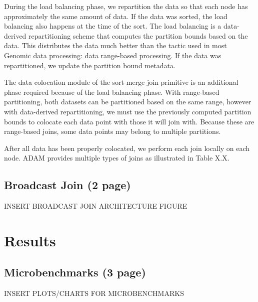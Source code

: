 \documentclass{vldb}
\begin{document}
During the load balancing phase, we repartition the data so that each node has approximately
the same amount of data. If the data was sorted, the load balancing also happens at the 
time of the sort. The load balancing is a data-derived repartitioning scheme that computes
the partition bounds based on the data. This distributes the data much better than the tactic 
used in most Genomic data processing: data range-based processing. If the data was 
repartitioned, we update the partition bound metadata.

The data colocation module of the sort-merge join primitive is an additional phase required
because of the load balancing phase. With range-based partitioning, both datasets can be
partitioned based on the same range, however with data-derived repartitioning, we must use
the previously computed partition bounds to colocate each data point with those it will join
with. Because these are range-based joins, some data points may belong to multiple 
partitions.

After all data has been properly colocated, we perform each join locally on each node. ADAM
provides multiple types of joins as illustrated in Table X.X.

\subsection{Broadcast Join  (2 page)}
\label{sec:broadcast}

INSERT BROADCAST JOIN ARCHITECTURE FIGURE

\section{Results}
\label{sec:results}

\subsection{Microbenchmarks (3 page)}
\label{sec:microbenchmarks}

INSERT PLOTS/CHARTS FOR MICROBENCHMARKS
\end{document}
